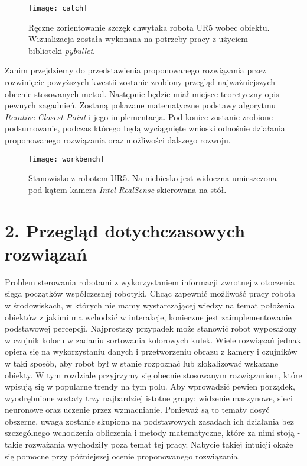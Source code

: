 \documentclass{article}
\begin{document}
\begin{figure}[h]
\centering
\texttt{[image: catch]}
\caption{Ręczne zorientowanie szczęk chwytaka robota UR5 wobec obiektu. Wizualizacja została wykonana na potrzeby pracy z użyciem biblioteki \emph{pybullet}.}
\end{figure}

Zanim przejdziemy do przedstawienia proponowanego rozwiązania przez rozwinięcie powyższych kwestii zostanie zrobiony przegląd najważniejszych obecnie stosowanych metod. Następnie będzie miał miejsce teoretyczny opis pewnych zagadnień. Zostaną pokazane matematyczne podstawy algorytmu \emph{Iterative Closest Point} i jego implementacja. Pod koniec zostanie zrobione podsumowanie, podczas którego będą wyciągnięte wnioski odnośnie działania proponowanego rozwiązania oraz możliwości dalszego rozwoju.

\begin{figure}[h]
\centering
\texttt{[image: workbench]}
\caption{Stanowisko z robotem UR5. Na niebiesko jest widoczna umieszczona pod kątem kamera \emph{Intel RealSense} skierowana na stół.}
\end{figure}

\newpage
\section*{\LARGE{2. Przegląd dotychczasowych rozwiązań}} 

Problem sterowania robotami z wykorzystaniem informacji zwrotnej z otoczenia sięga początków współczesnej robotyki. Chcąc zapewnić możliwość pracy robota w środowiskach, w których nie mamy wystarczającej wiedzy na temat położenia obiektów z jakimi ma wchodzić w interakcje, konieczne jest zaimplementowanie podstawowej percepcji. Najprostszy przypadek może stanowić robot wyposażony w czujnik koloru w zadaniu sortowania kolorowych kulek. Wiele rozwiązań jednak opiera się na wykorzystaniu danych i przetworzeniu obrazu z kamery i czujników w taki sposób, aby robot był w stanie rozpoznać lub zlokalizować wskazane obiekty. W tym rozdziale przyjrzymy się obecnie stosowanym rozwiązaniom, które wpisują się w popularne trendy na tym polu. Aby wprowadzić pewien porządek, wyodrębnione zostały trzy najbardziej istotne grupy: widzenie maszynowe, sieci neuronowe oraz uczenie przez wzmacnianie. Ponieważ są to tematy dosyć obszerne, uwaga zostanie skupiona na podstawowych zasadach ich działania bez szczególnego wchodzenia obliczenia i metody matematyczne, które za nimi stoją - takie rozważania wychodziły poza temat tej pracy. Nabycie takiej intuicji okaże się pomocne przy późniejszej ocenie proponowanego rozwiązania.
\end{document}

